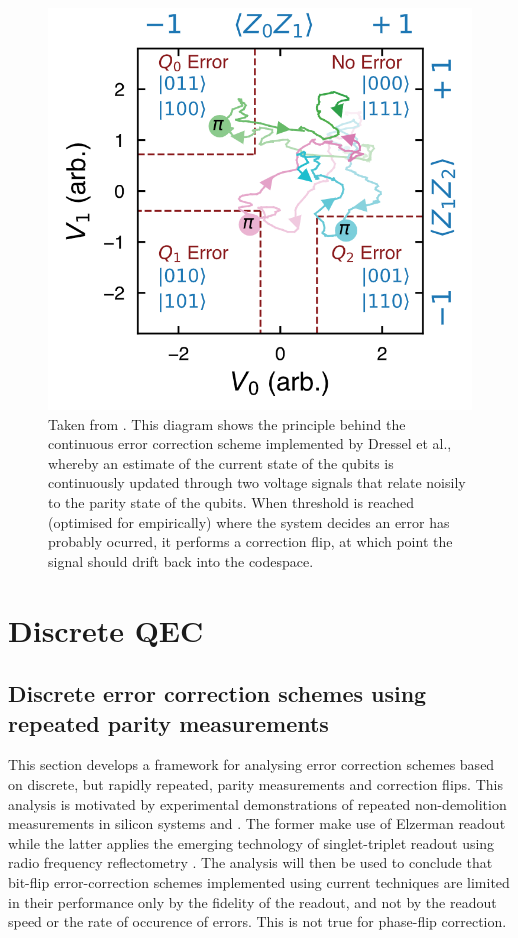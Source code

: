 \documentclass{report}
\begin{document}
\begin{figure}[ht]
    \centering
    \includegraphics[scale = 0.3]{Figures/dresseldiagram.png}
    \caption{Taken from \cite{Dressel2022}. This diagram shows the principle behind the continuous error correction scheme implemented by Dressel et al., whereby an estimate of the current state of the qubits is continuously updated through two voltage signals that relate noisily to the parity state of the qubits. When threshold is reached (optimised for empirically) where the system decides an error has probably ocurred, it performs a correction flip, at which point the signal should drift back into the codespace.}
    \label{fig:dresseldiagram}
\end{figure}


\chapter{Discrete QEC}


\section{Discrete error correction schemes using repeated parity measurements} \label{sec:repeat_analysis}
This section develops a framework for analysing error correction schemes based on discrete, but rapidly repeated, parity measurements and correction flips. This analysis is motivated by experimental demonstrations of repeated non-demolition measurements in silicon systems \cite{Xue2020} and \cite{Nakajima2019}. The former make use of Elzerman readout\cite{Elzerman2004} while the latter applies the emerging technology of singlet-triplet readout using radio frequency reflectometry \cite{Oakes2022}. The analysis will then be used to conclude that bit-flip error-correction schemes implemented using current techniques are limited in their performance only by the fidelity of the readout, and not by the readout speed or the rate of occurence of errors. This is not true for phase-flip correction. 
\end{document}

